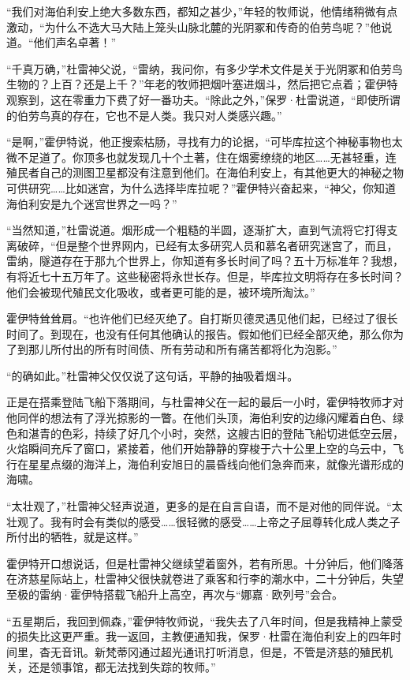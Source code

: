 \documentclass[AutoFakeBold=true]{book}
\begin{document}
``我们对海伯利安上绝大多数东西，都知之甚少，''年轻的牧师说，他情绪稍微有点激动，``为什么不选大马大陆上笼头山脉北麓的光阴冢和传奇的伯劳鸟呢？''他说道。``他们声名卓著！''

``千真万确，''杜雷神父说，``雷纳，我问你，有多少学术文件是关于光阴冢和伯劳鸟生物的？上百？还是上千？''年老的牧师把烟叶塞进烟斗，然后把它点着；霍伊特观察到，这在零重力下费了好一番功夫。``除此之外，''保罗·杜雷说道，``即使所谓的伯劳鸟真的存在，它也不是人类。我只对人类感兴趣。''

``是啊，''霍伊特说，他正搜索枯肠，寻找有力的论据，``可毕库拉这个神秘事物也太微不足道了。你顶多也就发现几十个土著，住在烟雾缭绕的地区……无甚轻重，连殖民者自己的测图卫星都没有注意到他们。在海伯利安上，有其他更大的神秘之物可供研究……比如迷宫，为什么选择毕库拉呢？''霍伊特兴奋起来，``神父，你知道海伯利安是九个迷宫世界之一吗？''

``当然知道，''杜雷说道。烟形成一个粗糙的半圆，逐渐扩大，直到气流将它打得支离破碎，``但是整个世界网内，已经有太多研究人员和慕名者研究迷宫了，而且，雷纳，隧道存在于那九个世界上，你知道有多长时间了吗？五十万标准年？我想，有将近七十五万年了。这些秘密将永世长存。但是，毕库拉文明将存在多长时间？他们会被现代殖民文化吸收，或者更可能的是，被环境所淘汰。''

霍伊特耸耸肩。``也许他们已经灭绝了。自打斯贝德灵遇见他们起，已经过了很长时间了。到现在，也没有任何其他确认的报告。假如他们已经全部灭绝，那么你为了到那儿所付出的所有时间债、所有劳动和所有痛苦都将化为泡影。''

``的确如此。''杜雷神父仅仅说了这句话，平静的抽吸着烟斗。

正是在搭乘登陆飞船下落期间，与杜雷神父在一起的最后一小时，霍伊特牧师才对他同伴的想法有了浮光掠影的一瞥。在他们头顶，海伯利安的边缘闪耀着白色、绿色和湛青的色彩，持续了好几个小时，突然，这艘古旧的登陆飞船切进低空云层，火焰瞬间充斥了窗口，紧接着，他们开始静静的穿梭于六十公里上空的乌云中，飞行在星星点缀的海洋上，海伯利安旭日的晨昏线向他们急奔而来，就像光谱形成的海啸。

``太壮观了，''杜雷神父轻声说道，更多的是在自言自语，而不是对他的同伴说。``太壮观了。我有时会有类似的感受……很轻微的感受……上帝之子屈尊转化成人类之子所付出的牺牲，就是这样。''

霍伊特开口想说话，但是杜雷神父继续望着窗外，若有所思。十分钟后，他们降落在济慈星际站上，杜雷神父很快就卷进了乘客和行李的潮水中，二十分钟后，失望至极的雷纳·霍伊特搭载飞船升上高空，再次与``娜嘉·欧列号''会合。

\vspace*{1em}

``五星期后，我回到佩森，''霍伊特牧师说，``我失去了八年时间，但是我精神上蒙受的损失比这更严重。我一返回，主教便通知我，保罗·杜雷在海伯利安上的四年时间里，杳无音讯。新梵蒂冈通过超光通讯打听消息，但是，不管是济慈的殖民机关，还是领事馆，都无法找到失踪的牧师。''
\end{document}
